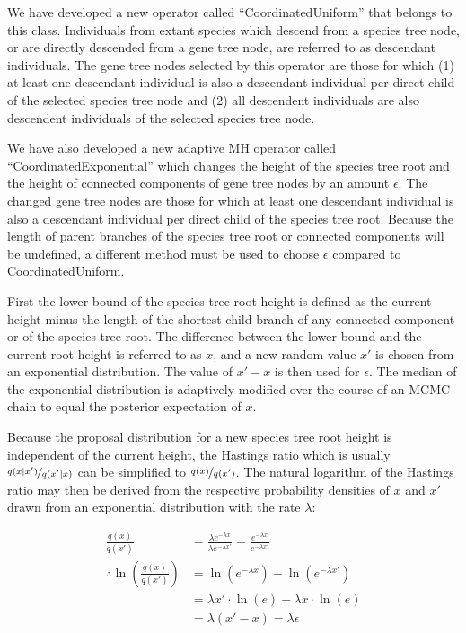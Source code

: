 \documentclass[12pt]{article}
\begin{document}
We have developed a new operator called ``CoordinatedUniform'' that belongs to
this class. Individuals from extant species which descend from a species tree
node, or are directly descended from a gene tree node, are referred to as
descendant individuals. The gene tree nodes selected by this operator are those
for which (1) at least one descendant individual is also a descendant individual
per direct child of the selected species tree node and (2) all descendent
individuals are also descendent individuals of the selected species tree node.

We have also developed a new adaptive MH \citep{Andrieu2008} operator called
``CoordinatedExponential'' which changes the height of the species tree root and
the height of connected components of gene tree nodes by an amount $\epsilon$.
The changed gene tree nodes are those for which at least one descendant individual
is also a descendant individual per direct child of the species tree root.
Because the length of parent branches of the species tree root or connected
components will be undefined, a different method must be used to choose
$\epsilon$ compared to CoordinatedUniform.

First the lower bound of the species tree root height is defined as the current
height minus the length of the shortest child branch of any connected component or
of the species tree root. The difference between the lower bound and the current
root height is referred to as $x$, and a new random value $x'$ is chosen from an
exponential distribution. The value of $x' - x$ is then used for $\epsilon$. The
median of the exponential distribution is adaptively modified over the course of
an MCMC chain to equal the posterior expectation of $x$.

Because the proposal distribution for a new species tree root height is
independent of the current height, the Hastings ratio which is usually
$\nicefrac{q(x|x')}{q(x'|x)}$ \citep{2015arXiv150401896R} can be simplified to
$\nicefrac{q(x)}{q(x')}$. The natural logarithm of the Hastings ratio may then
be derived from the respective probability densities of $x$ and
$x'$ drawn from an exponential distribution with the rate $\lambda$:

\begin{align}
\frac{q(x)}{q(x')} &= \frac{\lambda e^{-\lambda x}}{\lambda e^{-\lambda x'}} = \frac{e^{-\lambda x}}{e^{-\lambda x'}}\\
\therefore \ln\left(\frac{q(x)}{q(x')}\right) &= \ln\left(e^{-\lambda x}\right) - \ln\left(e^{-\lambda x'}\right)\\
& = \lambda x' \cdot \ln\left(e\right) - \lambda x \cdot \ln\left(e\right)\\
& = \lambda \left(x' - x\right) = \lambda \epsilon
\end{align}
\end{document}
